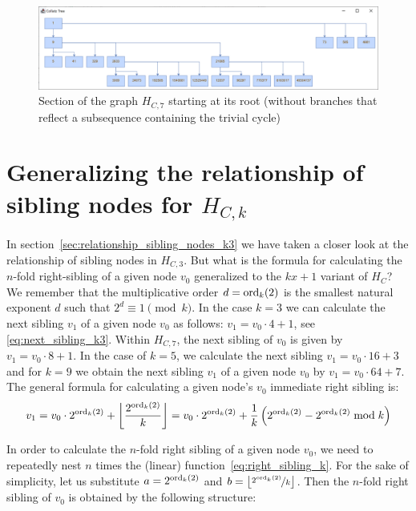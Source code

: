 \begin{figure}[H]
	\includegraphics[width=1.00\textwidth]{figures/h_c7.png}
	\caption{Section of the graph $H_{C,7}$ starting at its root (without branches that reflect a subsequence containing the trivial cycle)}
	\label{fig:hc7}
\end{figure}

\section{\texorpdfstring{Generalizing the relationship of sibling nodes for $H_{C,k}$}{Generalizing the relationship of sibling nodes for HCk}}
In section~\ref{sec:relationship_sibling_nodes_k3} we have taken a closer look at the relationship of sibling nodes in $H_{C,3}$. But what is the formula for calculating the $n$-fold right-sibling of a given node $v_0$ generalized to the $kx+1$ variant of $H_C$? We remember that the multiplicative order $d=\operatorname{ord}_k(2)$ is the smallest natural exponent $d$ such that $2^d\equiv 1\pmod k$. In the case $k=3$ we can calculate the next sibling $v_1$ of a given node $v_0$ as follows: $v_1=v_0\cdot4+1$, see \ref{eq:next_sibling_k3}. Within $H_{C,7}$, the next sibling of $v_0$ is given by $v_1=v_0\cdot8+1$. In the case of $k=5$, we calculate the next sibling $v_1=v_0\cdot16+3$ and for $k=9$ we obtain the next sibling $v_1$ of a given node $v_0$ by $v_1=v_0\cdot64+7$. The general formula for calculating a given node's $v_0$ immediate right sibling is:
\begin{equation}
\label{eq:right_sibling_k}
v_1=v_0\cdot2^{\operatorname{ord}_k(2)}+\left\lfloor\frac{2^{\operatorname{ord}_k(2)}}{k}\right\rfloor=v_0\cdot2^{\operatorname{ord}_k(2)}+\frac{1}{k}\left(2^{\operatorname{ord}_k(2)}-2^{\operatorname{ord}_k(2)}\bmod k\right)
\end{equation}

In order to calculate the $n$-fold right sibling of a given node $v_0$, we need to repeatedly nest $n$ times the (linear) function~\ref{eq:right_sibling_k}. For the sake of simplicity, let us substitute $a=2^{\operatorname{ord}_k(2)}$ and $b=\left\lfloor\nicefrac{2^{\operatorname{ord}_k(2)}}{k}\right\rfloor$. Then the $n$-fold right sibling of $v_0$ is obtained by the following structure:

